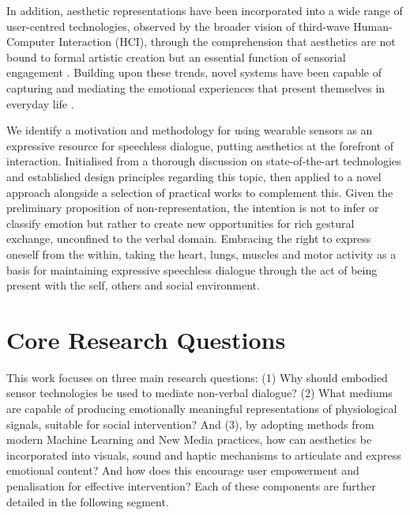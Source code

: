 In addition, aesthetic representations have been incorporated into a wide range of user-centred technologies, observed by the broader vision of third-wave Human-Computer Interaction (HCI), through the comprehension that aesthetics are not bound to formal artistic creation but an essential function of sensorial engagement \cite{bodker2015third}. Building upon these trends, novel systems have been capable of capturing and mediating the emotional experiences that present themselves in everyday life \cite{schiphorst_designing_2020}.

We identify a motivation and methodology for using wearable sensors as an expressive resource for speechless dialogue, putting aesthetics at the forefront of interaction. Initialised from a thorough discussion on state-of-the-art technologies and established design principles regarding this topic, then applied to a novel approach alongside a selection of practical works to complement this. Given the preliminary proposition of non-representation, the intention is not to infer or classify emotion but rather to create new opportunities for rich gestural exchange, unconfined to the verbal domain. Embracing the right to express oneself from the within, taking the heart, lungs, muscles and motor activity as a basis for maintaining expressive speechless dialogue through the act of being present with the self, others and social environment.

\section{Core Research Questions}
\label{sec:research_questions}

This work focuses on three main research questions: (1) Why should embodied sensor technologies be used to mediate non-verbal dialogue? (2) What mediums are capable of producing emotionally meaningful representations of physiological signals, suitable for social intervention? And (3), by adopting methods from modern Machine Learning and New Media practices, how can aesthetics be incorporated into visuals, sound and haptic mechanisms to articulate and express emotional content? And how does this encourage user empowerment and penalisation for effective intervention? Each of these components are further detailed in the following segment.


